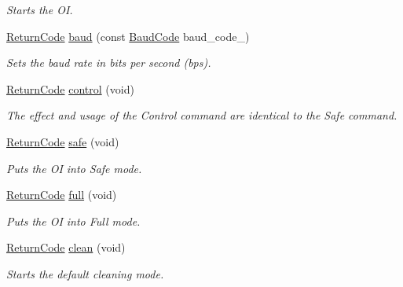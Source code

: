 \begin{DoxyCompactItemize}
\begin{DoxyCompactList}\small\item\em Starts the O\+I. \end{DoxyCompactList}\item 
\hyperlink{classroomba_1_1series500_1_1oi_1_1_o_i_encoder_ac2c8ad2f0306050926f89882d74696cc}{Return\+Code} \hyperlink{classroomba_1_1series500_1_1oi_1_1_o_i_encoder_ae97ef2868921728fee9b14f7ecfc4b5c}{baud} (const \hyperlink{namespaceroomba_1_1series500_1_1oi_ae5028fe52e1dabe309aff04a45581bfd}{Baud\+Code} baud\+\_\+code\+\_\+)
\begin{DoxyCompactList}\small\item\em Sets the baud rate in bits per second (bps). \end{DoxyCompactList}\item 
\hyperlink{classroomba_1_1series500_1_1oi_1_1_o_i_encoder_ac2c8ad2f0306050926f89882d74696cc}{Return\+Code} \hyperlink{classroomba_1_1series500_1_1oi_1_1_o_i_encoder_ad32a31a2fb7e5457685428949f14d25c}{control} (void)
\begin{DoxyCompactList}\small\item\em The effect and usage of the Control command are identical to the Safe command. \end{DoxyCompactList}\item 
\hyperlink{classroomba_1_1series500_1_1oi_1_1_o_i_encoder_ac2c8ad2f0306050926f89882d74696cc}{Return\+Code} \hyperlink{classroomba_1_1series500_1_1oi_1_1_o_i_encoder_a01413ddf9d88eb62229dad6d4ed1801d}{safe} (void)
\begin{DoxyCompactList}\small\item\em Puts the O\+I into Safe mode. \end{DoxyCompactList}\item 
\hyperlink{classroomba_1_1series500_1_1oi_1_1_o_i_encoder_ac2c8ad2f0306050926f89882d74696cc}{Return\+Code} \hyperlink{classroomba_1_1series500_1_1oi_1_1_o_i_encoder_aab8b00ade2c7a6fb9568ef1920734b5a}{full} (void)
\begin{DoxyCompactList}\small\item\em Puts the O\+I into Full mode. \end{DoxyCompactList}\item 
\hyperlink{classroomba_1_1series500_1_1oi_1_1_o_i_encoder_ac2c8ad2f0306050926f89882d74696cc}{Return\+Code} \hyperlink{classroomba_1_1series500_1_1oi_1_1_o_i_encoder_a93e858788e85afdf4a04237eb5c526e0}{clean} (void)
\begin{DoxyCompactList}\small\item\em Starts the default cleaning mode. \end{DoxyCompactList}\item 

\end{DoxyCompactItemize}
